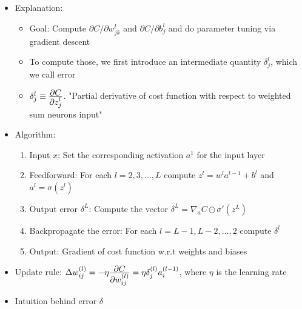 \begin{itemize}
    \item
        Explanation:
        \begin{itemize}
            \item
                Goal: Compute $\partial C/\partial w_{jk}^l$ and $\partial C/\partial b_j^l$ and do parameter tuning via gradient descent
            \item
                To compute those, we first introduce an intermediate quantity $\delta_j^l$, which we call error 
            \item
                $\delta_j^l \equiv \frac{\displaystyle \partial C}{\displaystyle \partial z_j^l}$. "Partial derivative of cost function with respect to weighted sum neurons input"
        \end{itemize}
    \item
        Algorithm:
        \begin{enumerate}
            \item
                Input $x$: Set the corresponding activation $a^1$ for the input layer
            \item
                Feedforward: For each $l = 2,3,\dots,L$ compute $z^l = w^l a^{l-1} + b^l$ and $a^l = \sigma(z^l)$
            \item
                Output error $\delta^L$: Compute the vector $\delta^L = \nabla_a C \odot \sigma'(z^L)$
            \item
                Backpropagate the error: For each $l = L-1, L-2, \dots, 2$ compute $\delta^l$
            \item
                Output: Gradient of cost function w.r.t weights and biases
        \end{enumerate}
    \item
        Update rule: $\Delta w_{ij}^{(l)} = -\eta \frac{\displaystyle \partial C}{\displaystyle \partial w_{ij}^{(l)}} = \eta \delta_j^{(l)}a_i^{(l-1)}$, where $\eta$ is the learning rate
    \item
        Intuition behind error $\delta$
        \begin{itemize}

\end{itemize}
\end{itemize}

